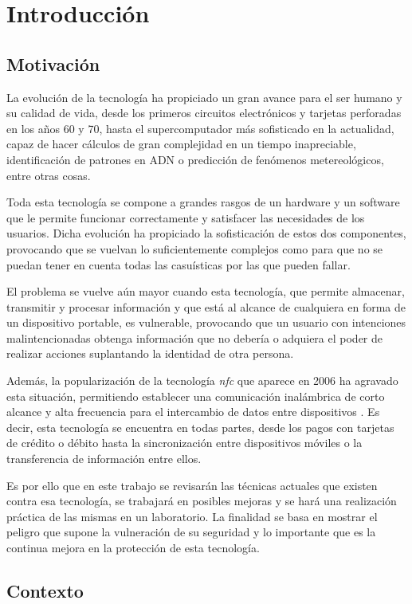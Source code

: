 \chapter{Introducción}

\section {Motivación}

La evolución de la tecnología ha propiciado un gran avance para el ser humano y su calidad de vida, desde los primeros circuitos electrónicos y tarjetas perforadas en los años 60 y 70, hasta el supercomputador más sofisticado en la actualidad, capaz de hacer cálculos de gran complejidad en un tiempo inapreciable, identificación de patrones en ADN o predicción de fenómenos metereológicos, entre otras cosas. \newline

Toda esta tecnología se compone a grandes rasgos de un hardware y un software que le permite funcionar correctamente y satisfacer las necesidades de los usuarios. Dicha evolución ha propiciado la sofisticación de estos dos componentes, provocando que se vuelvan lo suficientemente complejos como para que no se puedan tener en cuenta todas las casuísticas por las que pueden fallar. \newline

El problema se vuelve aún mayor cuando esta tecnología, que permite almacenar, transmitir y procesar información y que está al alcance de cualquiera en forma de un dispositivo portable, es vulnerable, provocando que un usuario con intenciones malintencionadas obtenga información que no debería o adquiera el poder de realizar acciones suplantando la identidad de otra persona. \newline

Además, la popularización de la tecnología \textit{\acrshort{nfc}} que aparece en 2006 ha agravado esta situación, permitiendo establecer una comunicación inalámbrica de corto alcance y alta frecuencia para el intercambio de datos entre dispositivos \cite{NFCFechaCreacion}. Es decir, esta tecnología se encuentra en todas partes, desde los pagos con tarjetas de crédito o débito hasta la sincronización entre dispositivos móviles o la transferencia de información entre ellos. \newline

Es por ello que en este trabajo se revisarán las técnicas actuales que existen contra esa tecnología, se trabajará en posibles mejoras y se hará una realización práctica de las mismas en un laboratorio. La finalidad se basa en mostrar el peligro que supone la vulneración de su seguridad y lo importante que es la continua mejora en la protección de esta tecnología.

\section{Contexto}